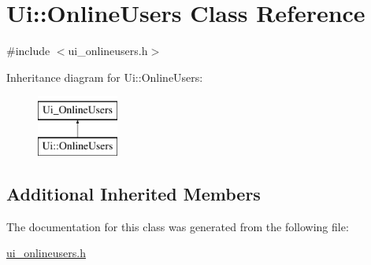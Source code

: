 \hypertarget{classUi_1_1OnlineUsers}{\section{Ui\-:\-:Online\-Users Class Reference}
\label{classUi_1_1OnlineUsers}
}


{\ttfamily \#include $<$ui\-\_\-onlineusers.\-h$>$}

Inheritance diagram for Ui\-:\-:Online\-Users\-:\begin{figure}[H]
\begin{center}
\leavevmode
\includegraphics[height=2.000000cm]{classUi_1_1OnlineUsers}
\end{center}
\end{figure}
\subsection*{Additional Inherited Members}


The documentation for this class was generated from the following file\-:\begin{DoxyCompactItemize}
\item 
\hyperlink{ui__onlineusers_8h}{ui\-\_\-onlineusers.\-h}\end{DoxyCompactItemize}
